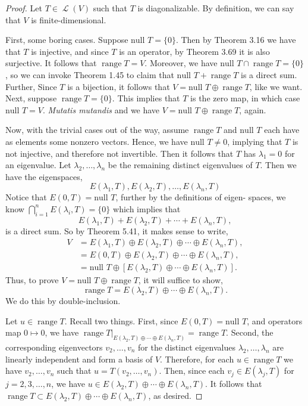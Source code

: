 \documentclass[letterpaper, 12pt]{amsart}
\DeclareMathOperator{\Ell}{\mathscr{L}}				%
\renewcommand{\null}{\text{null }}					%
\DeclareMathOperator{\range}{\text{range }}			%
\theoremstyle{definition}  							%
\begin{document}
		\begin{proof}
		Let $T \in \Ell(V)$ such that $T$ is diagonalizable.
		By definition, we can say that $V$ is finite-dimensional.

		First, some boring cases.
		Suppose $\null T = \{ 0 \}$.
		Then by Theorem 3.16 we have that $T$ is injective, and since $T$ is an operator, by Theorem 3.69 it is also surjective.
		It follows that $\range T = V$.
		Moreover, we have $\null T \cap \range T = \{ 0 \}$, so we can invoke Theorem 1.45 to claim that $\null T + \range T$ is a direct sum.
		Further, Since $T$ is a bijection, it follows that $V = \null T \oplus \range T$, like we want.
		Next, suppose $\range T = \{ 0 \}$.
		This implies that $T$ is the zero map, in which case $\null T = V$.
		\textit{Mutatis mutandis} and we have $V = \null T \oplus \range T$, again.

		Now, with the trivial cases out of the way, assume $\range T$ and $\null T$ each have as elements some nonzero vectors.
		Hence, we have $\null T \neq 0$, implying that $T$ is not injective, and therefore not invertible.
		Then it follows that $T$ has $\lambda_{1} = 0$ for an eigenvalue.
		Let $\lambda_{2}, \dots, \lambda_{n}$ be the remaining distinct eigenvalues of $T$.
		Then we have the eigenspaces, $$E(\lambda_{1}, T), E(\lambda_{2},T), \dots, E(\lambda_{n}, T)$$
		Notice that $E(0,T) = \null T$, further by the definitions of eigen-
		spaces, we know $\bigcap_{i=1}^{n} E(\lambda_{i},T) = \{ 0 \}$ which implies that $$E(\lambda_{1}, T) + E(\lambda_{2},T) + \cdots + E(\lambda_{n}, T),$$ is a direct sum.
		So by Theorem 5.41, it makes sense to write,
			\begin{align*}
				V &= E(\lambda_{1}, T) \oplus E(\lambda_{2},T) \oplus \cdots \oplus E(\lambda_{n}, T), \\
				&= E(0, T) \oplus E(\lambda_{2},T) \oplus \cdots \oplus E(\lambda_{n}, T), \\
				&= \null T \oplus \left[ E(\lambda_{2},T) \oplus \cdots \oplus E(\lambda_{n}, T) \right].
			\end{align*}
		Thus, to prove $V = \null T \oplus \range T$, it will suffice to show, $$\range T = E(\lambda_{2},T) \oplus \cdots \oplus E(\lambda_{n}, T).$$
		We do this by double-inclusion.

		Let $u \in \range T$.
		Recall two things.
		First, since $E(0,T) = \null T$, and operators map $0 \mapsto 0$, we have $\range T|_{E(\lambda_{2},T) \oplus \cdots \oplus E(\lambda_{n}, T)} = \range T$.
		Second, the corresponding eigenvectors $v_{2}, \dots, v_{n}$ for the distinct eigenvalues $\lambda_{2}, \dots, \lambda_{n}$ are linearly independent and form a basis of $V$.
		Therefore, for each $u \in \range T$ we have $v_{2}, \dots, v_{n}$ such that $u = T(v_{2}, \dots, v_{n})$.
		Then, since each $v_{j} \in E(\lambda_{j},T)$ for $j = 2,3,\dots,n$, we have $u \in E(\lambda_{2},T) \oplus \cdots \oplus E(\lambda_{n}, T)$.
		It follows that $\range T \subset E(\lambda_{2},T) \oplus \cdots \oplus E(\lambda_{n}, T)$, as desired.


\end{proof}
\end{document}
